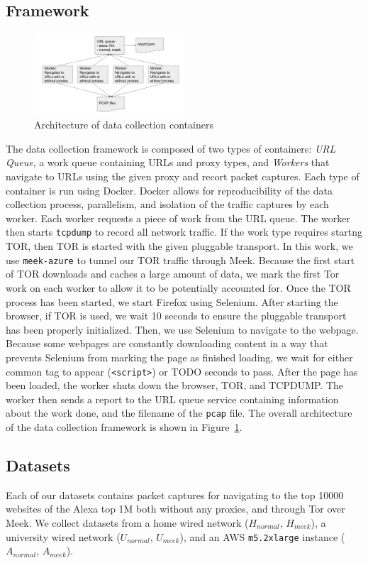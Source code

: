 \subsection{Framework}
\begin{figure}[H]
    \centering
    \includegraphics[width=0.5\textwidth]{figures/data-collection-architecture}
    \caption{\label{fig:data-collection-architecture} Architecture of data collection containers} 
\end{figure}
The data collection framework is composed of two types of containers: \textit{URL Queue}, a work queue containing URLs and proxy types, and \textit{Workers} that navigate to URLs using the given proxy and recort packet captures. Each type of container is run using Docker. Docker allows for reproducibility of the data collection process, parallelism, and isolation of the traffic captures by each worker. Each worker requests a piece of work from the URL queue. The worker then starts \texttt{tcpdump} to record all network traffic. If the work type requires startng TOR, then TOR is started with the given pluggable transport. In this work, we use \texttt{meek-azure} to tunnel our TOR traffic through Meek. Because the first start of TOR downloads and caches a large amount of data, we mark the first Tor work on each worker to allow it to be potentially accounted for. Once the TOR process has been started, we start Firefox using Selenium. After starting the browser, if TOR is used, we wait 10 seconds to ensure the pluggable transport has been properly initialized. Then, we use Selenium to navigate to the webpage. Because some webpages are constantly downloading content in a way that prevents Selenium from marking the page as finished loading, we wait for either common tag to appear (\texttt{<script>}) or {TODO} seconds to pass. After the page has been loaded, the worker shuts down the browser, TOR, and TCPDUMP. The worker then sends a report to the URL queue service containing information about the work done, and the filename of the \texttt{pcap} file. The overall architecture of the data collection framework is shown in Figure~\ref{fig:data-collection-architecture}.
\subsection{Datasets}
Each of our datasets contains packet captures for navigating to the top 10000 websites of the Alexa top 1M both without any proxies, and through Tor over Meek. We collect datasets from a home wired network ($H_{normal}$, $H_{meek}$), a university wired network ($U_{normal}$, $U_{meek}$), and an AWS \texttt{m5.2xlarge} instance ($A_{normal}$, $A_{meek}$).
